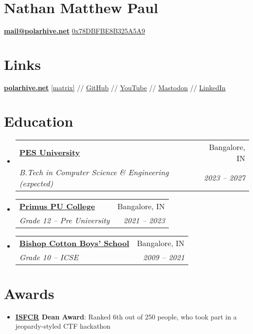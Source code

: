\documentclass[letterpaper, 11pt]{article}
\makeatletter
\newcommand{\resumeItem}[2]{
  \item\small{
    \textbf{#1}{: #2 \vspace{-2pt}}
  }
}
\newcommand{\resumeSubheading}[4]{
 \vspace{-1pt}\item
 \begin{tabular*}{0.97\textwidth}[t]{l@{\extracolsep{\fill}}r}
   \textbf{#1} & #2 \\
  \textit{\small#3} & \textit{\small #4} \\
 \end{tabular*}\vspace{-5pt}
}
\newcommand{\resumeSubItem}[2]{\resumeItem{#1}{#2}\vspace{-4pt}}
\newcommand{\resumeSubHeadingListStart}{\begin{itemize}[leftmargin=*]}
\newcommand{\resumeSubHeadingListEnd}{\end{itemize}}
\makeatother
\begin{document}
\section{\Huge {\textbf {Nathan Matthew Paul}}}
{\textbf{\href{mailto:mail@polarhive.net}{mail@polarhive.net}}}
\newline
{\href{https://polarhive.net/.well-known/polarhive_gpg.txt}{0x78DBFBE8B325A5A9}}
\section{Links}
{\textbf{\href{https://polarhive.net}{polarhive.net}}
\newline
{\href{https://matrix.to/#/@polarhive:matrix.org}{[matrix]}} //
{\href{https://github.com/polarhive}{GitHub}} //
{\href{https://youtube.com/polarhive}{YouTube}} //
{\href{https://mastodon.social/@polarhive}{Mastodon}} //
{\href{https://www.linkedin.com/in/polarhive}{LinkedIn}}


\section{Education}
  \resumeSubHeadingListStart
    \resumeSubheading
      {\href{https://pes.edu}{PES University}}{Bangalore, IN}
      {B.Tech in Computer Science \& Engineering (expected)} {2023 -- 2027}
    \resumeSubheading
      {\href{https://primuspucollege.edu.in}{Primus PU College}}{Bangalore, IN}
      {Grade 12 -- Pre University}{2021 -- 2023}
    \resumeSubheading
      {\href{https://en.wikipedia.org/wiki/Bishop_Cotton_Boys'_School}{Bishop Cotton Boys' School}}{Bangalore, IN}
      {Grade 10 -- ICSE}{2009 -- 2021}
\resumeSubHeadingListEnd

\section{Awards}
  \resumeSubHeadingListStart
    \resumeSubItem{\href{https://isfcr.pes.edu}{ISFCR} Dean Award}
     {Ranked 6th out of 250 people, who took part in a jeopardy-styled CTF hackathon}
  \resumeSubHeadingListEnd

}
\end{document}
